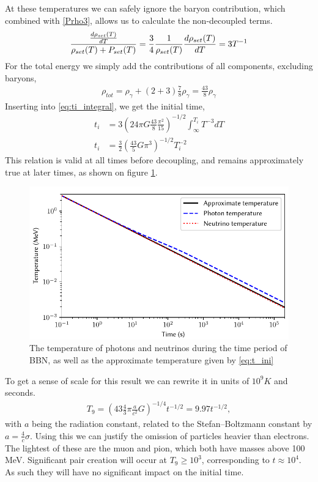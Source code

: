 At these temperatures we can safely ignore the baryon contribution, which combined with \eqref{Prho3}, allows us to calculate the non-decoupled terms.
\begin{align}
    \frac{\frac{d\rho_{set}(T)}{dT}}{\rho_{set}(T) + P_{set}(T)}=\frac{3}{4}\frac{1}{\rho_{set}(T)}\frac{d\rho_{set}(T)}{dT}=3T^{-1}
\end{align}
For the total energy we simply add the contributions of all components, excluding baryons,
\begin{align}
    \rho_{tot}=\rho_\gamma+(2+3)\frac{7}{8}\rho_\gamma=\frac{43}{8}\rho_\gamma
\end{align}
Inserting into \eqref{eq:ti_integral}, we get the initial time,
\begin{align}
    t_i&=3(24\pi G\frac{43}{8}\frac{\pi^2}{15})^{-1/2}\int_{\infty}^{T_i}T^{-3}dT\\
    t_i&=\frac{3}{2}( \frac{43}{5}G\pi^3)^{-1/2}T_i^{-2}
    \label{eq:t_ini}
\end{align}
This relation is valid at all times before decoupling, and remains approximately true at later times, as shown on figure \ref{fig:Temperature}.
\begin{figure}[ht]
    \includegraphics[width=5.1in]{figures/Temperature.pdf}
    \caption{The temperature of photons and neutrinos during the time period of BBN, as well as the approximate temperature given by \ref{eq:t_ini}}
    \label{fig:Temperature}
\end{figure}

To get a sense of scale for this result we can rewrite it in units of $10^9K$ and seconds.
\begin{align}
    T_9=( 43 \frac{4}{3}\pi\frac{a}{c^2}G)^{-1/4}t^{-1/2}=9.97t^{-1/2},
    \label{eq:T9_ini}
\end{align}
with $a$ being the radiation constant, related to the Stefan–Boltzmann constant by $a=\frac{4}{c}\sigma$. 
Using this we can justify the omission of particles heavier than electrons. The lightest of these are the muon and pion, which both have masses above 100 MeV. Significant pair creation will occur at $T_9 \geq 10^3$, corresponding to $t\approx10^4$. As such they will have no significant impact on the initial time. 


